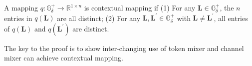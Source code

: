 \begin{definition}  A mapping $q: \mathbb{G}_\delta^+ \rightarrow \mathbb{R}^{1\times n}$ is contextual mapping if (1) For any $\mathbf{L} \in \mathbb{G}_\delta^+$, the $n$ entries in $q(\mathbf{L})$ are all distinct; (2) For any $\mathbf{L},\mathbf{L}^\prime \in \mathbb{G}_\delta^+$ with $\mathbf{L} \neq \mathbf{L}^\prime$, all entries of $q(\mathbf{L})$ and $q(\mathbf{L}^\prime)$ are distinct.
\end{definition}

The key to the proof is to show inter-changing use of token mixer and channel mixer can achieve contextual mapping.

